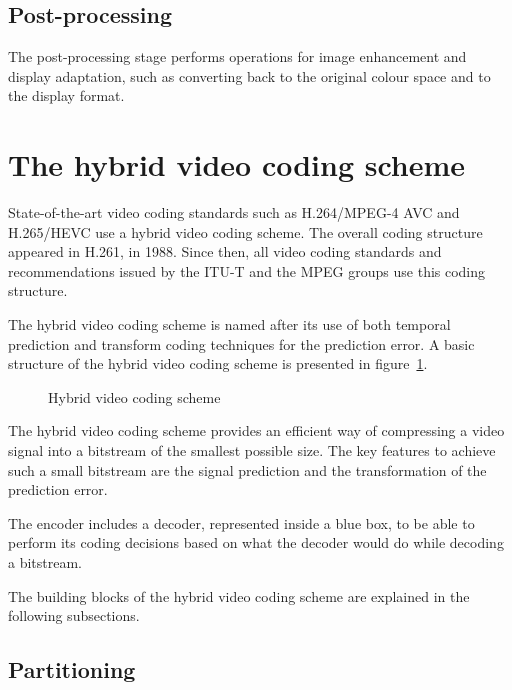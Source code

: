 \documentclass[11pt,a4paper,openright,twoside]{book}
\numberwithin{equation}{section} %
\numberwithin{figure}{section} %
\numberwithin{table}{section} %
\begin{document}
\subsection{Post-processing}
\label{sub:post_processing}

The post-processing stage performs operations for image enhancement and
display adaptation, such as converting back to the original colour
space and to the display format.

\section{The hybrid video coding scheme}
\label{sec:the_hybrid_video_coding_scheme}

State-of-the-art video coding standards such as H.264/\acs{MPEG}-4 \acs{AVC}
and H.265/\acs{HEVC} use a hybrid video coding scheme.
The overall coding structure appeared in H.261, in 1988.
Since then, all video coding standards and recommendations issued by the
\ac{ITU-T} and the \ac{MPEG} groups use this coding structure.

The hybrid video coding scheme is named after its use of both temporal
prediction and transform coding techniques for the prediction error.
A basic structure of the hybrid video coding scheme is presented in
figure~\ref{fig:hybrid_video_coding_scheme}.

\begin{figure}[tb]
	\centering
	
	\caption{Hybrid video coding scheme}
	\label{fig:hybrid_video_coding_scheme}
\end{figure}

The hybrid video coding scheme provides an efficient way of compressing
a video signal into a bitstream of the smallest possible size.
The key features to achieve such a small bitstream are the signal
prediction and the transformation of the prediction error.

The encoder includes a decoder, represented inside a blue box, to be
able to perform its coding decisions based on what the decoder would do
while decoding a bitstream.

The building blocks of the hybrid video coding scheme are explained in
the following subsections.

\subsection{Partitioning}
\label{sub:partitioning}
\end{document}
